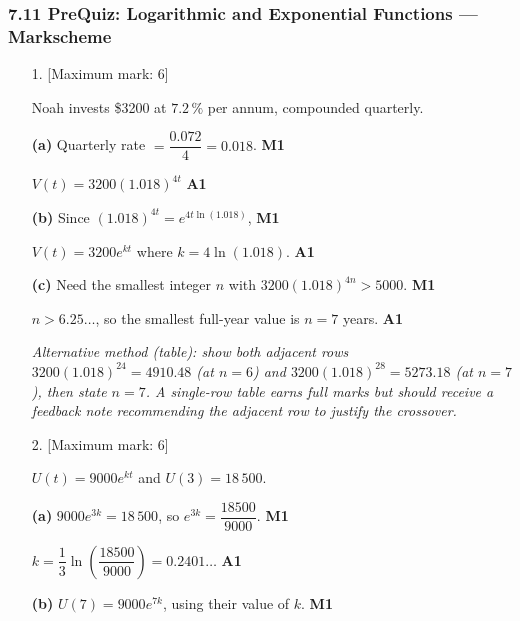 \documentclass[12pt, twoside]{article}
\begin{document}
\subsubsection*{7.11 PreQuiz: Logarithmic and Exponential Functions ---
Markscheme}

\begin{enumerate}[itemsep=0.3cm]

\item[1.] [Maximum mark: 6]

Noah invests \$3200 at $7.2\,\%$ per annum, compounded quarterly.

\medskip

\textbf{(a)} Quarterly rate $=\dfrac{0.072}{4}=0.018$. \hfill \textbf{M1}

$V(t)=3200(1.018)^{4t}$ \hfill \textbf{A1}

\medskip

\textbf{(b)} Since $(1.018)^{4t}=e^{4t\ln(1.018)}$,
\hfill \textbf{M1}

$V(t)=3200e^{kt}$ where $k=4\ln(1.018)$. \hfill \textbf{A1}

\medskip

\textbf{(c)} Need the smallest integer $n$ with
$3200(1.018)^{4n}>5000$. \hfill \textbf{M1}

$n>6.25\ldots$, so the smallest full-year value is $n=7$ years.
\hfill \textbf{A1}

\emph{Alternative method (table): show both adjacent rows
$3200(1.018)^{24}=4910.48$ (at $n=6$) and $3200(1.018)^{28}=5273.18$
(at $n=7$), then state $n=7$. A single-row table earns full marks but
should receive a feedback note recommending the adjacent row to
justify the crossover.}

\newpage

\item[2.] [Maximum mark: 6]

$U(t)=9000e^{kt}$ and $U(3)=18\,500$.

\medskip

\textbf{(a)} $9000e^{3k}=18\,500$, so $e^{3k}=\dfrac{18500}{9000}$.
\hfill \textbf{M1}

$k=\dfrac{1}{3}\ln\!\left(\dfrac{18500}{9000}\right)
=0.2401\ldots$ \hfill \textbf{A1}

\medskip

\textbf{(b)} $U(7)=9000e^{7k}$, using their value of $k$.
\hfill \textbf{M1}


\end{enumerate}
\end{document}
